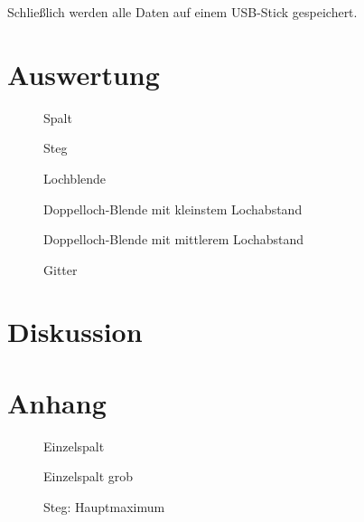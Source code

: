 \documentclass[12pt,a4paper,titlepage,headinclude,bibtotoc]{scrartcl}
\begin{document}
Schließlich werden alle Daten auf einem USB-Stick gespeichert.

\section{Auswertung}
\label{sec:auswertung}

\begin{figure}[!htb]
	\centering
	
	\caption{Spalt}
\end{figure}

\begin{figure}[!htb]
	\centering
	
	\caption{Steg}
\end{figure}

\begin{figure}[!htb]
	\centering
	
	\caption{Lochblende}
\end{figure}

\begin{figure}[!htb]
	\centering
	
	\caption{Doppelloch-Blende mit kleinstem Lochabstand}
\end{figure}

\begin{figure}[!htb]
	\centering
	
	\caption{Doppelloch-Blende mit mittlerem Lochabstand}
\end{figure}

\begin{figure}[!htb]
	\centering
	
	\caption{Gitter}
\end{figure}

\section{Diskussion}
\label{sec:diskussion}

\section{Anhang}

\begin{figure}[!htb]
	\centering
	
	\caption{Einzelspalt}
\end{figure}

\begin{figure}[!htb]
	\centering
	
	\caption{Einzelspalt grob}
\end{figure}

\begin{figure}[!htb]
	\centering
	
	\caption{Steg: Hauptmaximum}
\end{figure}
\end{document}
